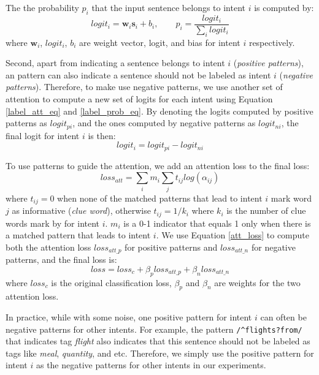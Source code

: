 The the probability $p_i$ that the input sentence belongs to intent $i$ is computed by:
\begin{equation}
logit_i=\textbf{w}_i\textbf{s}_i + b_i, \quad\quad p_i = \frac{logit_i}{\sum_{i}{logit_i}}
\label{label_prob_eq}
\end{equation}
where $\textbf{w}_i$, $logit_i$, $b_i$ are weight vector, logit, and bias for intent $i$ respectively.

Second, apart from indicating a sentence belongs to intent $i$ (\emph{positive patterns}), an \RE pattern can also indicate a sentence should not be labeled as intent $i$ (\emph{negative patterns}). Therefore, to make use negative patterns, we use another set of attention to compute a new set of logits for each intent using Equation \ref{label_att_eq} and \ref{label_prob_eq}. By denoting the logits computed by positive patterns as $logit_{pi}$, and the ones computed by negative patterns as $logit_{ni}$, the final logit for intent $i$ is then: 
\begin{equation}
logit_i = logit_{pi} - logit_{ni}
\end{equation}

To use \RE patterns to guide the attention, we add an attention loss to the final loss:
\begin{equation}
loss_{att} = \sum_{i}{m_i\sum_{j}{t_{ij}log(\alpha_{ij})}}
\label{att_loss}
\end{equation}
where $t_{ij} = 0$ when none of the matched patterns that lead to intent $i$ mark word $j$ as informative (\emph{clue word}), otherwise $t_{ij} = 1/k_{i}$ where $k_i$ is the number of clue words mark by \RE for intent $i$. $m_i$ is a 0-1 indicator that equals 1 only when there is a matched \RE pattern that leads to intent $i$. We use Equation \ref{att_loss} to compute both the attention loss $loss_{att\_p}$ for positive patterns and $loss_{att\_n}$ for negative patterns, and the final loss is:
\begin{equation}
loss = loss_{c} + \beta_p loss_{att\_p} + \beta_n loss_{att\_n}
\end{equation} 
where $loss_{c}$ is the original classification loss, $\beta_p$ and $\beta_n$ are weights for the two attention loss.

In practice, while with some noise, one positive pattern for intent $i$ can often be negative patterns for other intents. For example, the pattern \texttt{/\textasciicircum flights?\:from/} that indicates tag \emph{flight} also indicates that this sentence should not be labeled as tags like \emph{meal}, \emph{quantity}, and etc.
Therefore, we simply use the positive pattern for intent $i$ as the negative patterns for other intents in our experiments.


